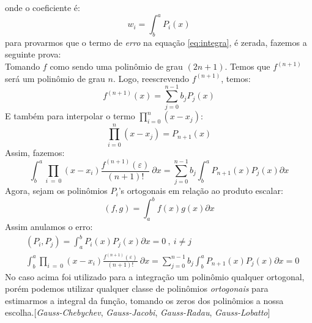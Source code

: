 onde o coeficiente é:
\begin{equation}
 w_i =  \int^{a}_b  P_i(x) 
\end{equation}
 para provarmos que o termo de \emph{erro} na equação \eqref{eq:integra}, é zerada, fazemos a seguinte prova:\\
 Tomando $f$ como sendo uma polinômio de grau $(2n+1)$. Temos que $f^{(n+1)}$ será um polinômio de grau $n$. Logo, reescrevendo $f^{(n+1)}$, temos:
 \begin{equation}
 f^{(n+1)}(x) = \sum^{n-1}_{j = 0} b_j P_j(x)
 \end{equation}
 E também para interpolar o termo $\prod^{n}_{i = 0} (x - x_j)$:
\begin{equation}
 \prod^{n}_{i = 0} (x - x_j) =  P_{n+1}(x)
\end{equation}  
Assim, fazemos:
\begin{equation}
\int^{a}_b \prod_{i\ =\ 0} (x - x_i)\frac{f^{(n+1)}(\varepsilon)}{(n+1)!}\ \partial x = \sum^{n-1}_{j = 0} b_j \int^{a}_b   P_{n+1}(x) P_j(x) \partial x
\end{equation}
 Agora, sejam os polinômios $P_i$'s ortogonais em relação ao produto escalar:
\begin{equation}
 (f,g) = \int^b_a f(x)g(x) \partial x
\end{equation}
 Assim anulamos o erro:
\begin{align}
&(P_i,P_j) = \int^b_a P_i(x) P_j(x) \partial x = 0\ ,\ i \neq j\\
&\int^{a}_b \prod_{i\ =\ 0} (x - x_i)\frac{f^{(n+1)}(\varepsilon)}{(n+1)!}\ \partial x = \sum^{n-1}_{j = 0} b_j \int^{a}_b   P_{n+1}(x) P_j(x) \partial x = 0
\end{align}
 No caso acima foi utilizado para a integração um polinômio qualquer ortogonal, porém podemos utilizar qualquer classe de polinômios \emph{ortogonais} para estimarmos a integral da função, tomando os zeros dos polinômios a nossa escolha.[\emph{Gauss-Chebychev}, \emph{Gauss-Jacobi}, \emph{Gauss-Radau}, \emph{Gauss-Lobatto}]
 
